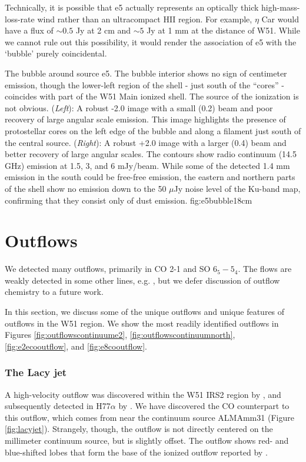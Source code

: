 \documentclass{emulateapj}
\begin{document}
Technically, it is possible that e5 actually represents an optically thick
high-mass-loss-rate wind rather than an ultracompact HII region. 
For example, $\eta$ Car would have a flux of $\sim0.5$ Jy at 2 cm
and $\sim5$ Jy at 1 mm at the distance of W51.  While we cannot rule out
this possibility, it would render the association of e5 with the `bubble'
purely coincidental.

{The bubble around source e5.  The bubble interior shows no sign of centimeter
emission, though the lower-left region of the shell - just south of the
``cores'' - coincides with part of the W51 Main ionized shell.  The source of
the ionization is not obvious.
({\it Left}): A robust -2.0 image with a small (0.2\arcsec) beam and poor
recovery of large angular scale emission.  This image highlights the presence
of protostellar cores on the left edge of the bubble and along a filament just
south of the central source.
({\it Right}): A robust +2.0 image with a larger (0.4\arcsec) beam and better
recovery of large angular scales.  The contours show radio continuum (14.5 GHz)
emission at 1.5, 3, and 6 mJy/beam.  While some of the detected 1.4 mm emission
in the south could be free-free emission, the eastern and northern parts of the
shell show no emission down to the 50 $\mu$Jy noise level of the Ku-band map,
confirming that they consist only of dust emission.
}{fig:e5bubble}{1}{8cm}


\section{Outflows}
\label{sec:outflows}
We detected many outflows, primarily in CO 2-1 and SO $6_5-5_4$.  The flows are
weakly detected in some other lines, e.g. \formaldehyde, but we defer
discussion of outflow chemistry to a future work.

In this section, we discuss some of the unique outflows and unique features of
outflows in the W51 region.  We show the most readily identified outflows in
Figures \ref{fig:outflowscontinuume2}, \ref{fig:outflowscontinuumnorth},
\ref{fig:e2ecooutflow}, and \ref{fig:e8cooutflow}.

\subsubsection{The Lacy jet}
\label{sec:lacyjet}
A high-velocity outflow was discovered within the W51 IRS2 region by
\citet{Lacy2007a}, and subsequently detected in H77$\alpha$ by
\citet{Ginsburg2016b}.  We have discovered the CO counterpart to this
outflow, which comes from near the continuum source ALMAmm31 (Figure
\ref{fig:lacyjet}).  Strangely, though, the outflow is not directly centered on
the millimeter continuum source, but is slightly offset.  The outflow shows red- and
blue-shifted lobes that form the base of the ionized outflow reported by
\citet[][Figure \ref{fig:outflowscontinuumnorth}]{Lacy2007a}.
\end{document}
